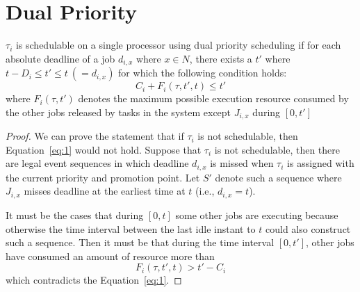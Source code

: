 \section{Dual Priority}




\begin{theorem}
\label{theorem:1}
$\tau_i$ is schedulable on a single processor using dual priority scheduling if  for each absolute deadline of a job  $d_{i,x}$  where $x\in N$, there exists a $t'$ where $t-D_i\leq t'\leq t~(=d_{i,x})$ for which the following condition holds: 
\begin{equation}
\label{eq:1}
C_i+F_i(\tau,t',t)\leq t'
\end{equation} 
where $F_i(\tau,t')$ denotes the maximum possible execution resource consumed by  the other jobs released by tasks in the system  except $J_{i,x}$  during $[0,t']$
\end{theorem}
\begin{proof}
We can prove the statement that if $\tau_i$ is not schedulable, then Equation~\ref{eq:1} would not hold. Suppose that $\tau_i$ is not schedulable, then there are legal event sequences in which deadline $d_{i,x}$ is missed when $\tau_i$ is assigned with the current priority and promotion point. Let $S'$ denote such a sequence where $J_{i,x}$ misses deadline at the earliest time at $t$ (i.e., $d_{i,x}=t$). 

It must be the cases that during $[0,t]$ some other jobs are executing because otherwise the time interval between the last idle instant to $t$ could also construct such a sequence. Then it must be that during the time interval $[0,t']$, other jobs have consumed an amount of resource more than 
\[
F_i(\tau,t',t)>t'-C_i
\]
which contradicts the Equation~\ref{eq:1}.
\end{proof}

